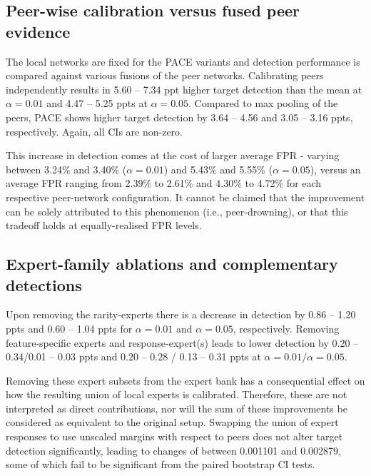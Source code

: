 \subsection{Peer-wise calibration versus fused peer evidence} 
\label{sec:peer-fusion} 
The local networks are fixed for the PACE variants and detection performance is compared against various fusions of the peer networks. Calibrating peers independently results in 5.60 -- 7.34 ppt higher target detection than the mean at $\alpha = 0.01$ and 4.47 -- 5.25 ppts at $\alpha = 0.05$. Compared to max pooling of the peers, PACE shows higher target detection by 3.64 -- 4.56 and 3.05 -- 3.16 ppts, respectively. Again, all CIs are non-zero.

This increase in detection comes at the cost of larger average FPR - varying between 3.24\% and 3.40\% ($\alpha=0.01$) and 5.43\% and 5.55\% ($\alpha = 0.05$), versus an average FPR ranging from 2.39\% to 2.61\% and 4.30\% to 4.72\% for each respective peer-network configuration. It cannot be claimed that the improvement can be solely attributed to this phenomenon (i.e., peer-drowning), or that this tradeoff holds at equally-realised FPR levels.

\subsection{Expert-family ablations and complementary detections} 
Upon removing the rarity-experts there is a decrease in detection by 0.86 -- 1.20 ppts and 0.60 -- 1.04 ppts for $\alpha = 0.01$ and $\alpha = 0.05$, respectively. Removing feature-specific experts and response-expert(s) leads to lower detection by 0.20 -- 0.34/0.01 -- 0.03 ppts and 0.20 -- 0.28 / 0.13 -- 0.31 ppts at $\alpha = 0.01$/$\alpha=0.05$.

Removing these expert subsets from the expert bank has a consequential effect on how the resulting union of local experts is calibrated. Therefore, these are not interpreted as direct contributions, nor will the sum of these improvements be considered as equivalent to the original setup. Swapping the union of expert responses to use unscaled margins with respect to peers does not alter target detection significantly, leading to changes of between 0.001101 and 0.002879, some of which fail to be significant from the paired bootstrap CI tests.

